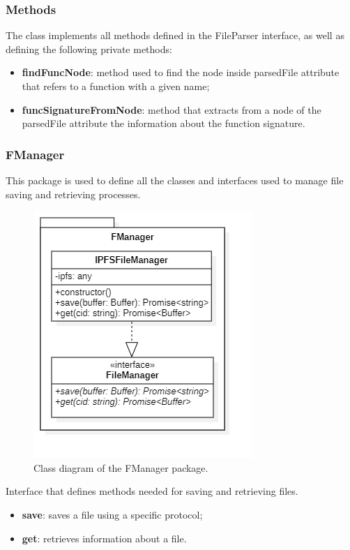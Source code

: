 				\subsubsection*{Methods}
				The class implements all methods defined in the FileParser interface, as well as defining the following private methods: 
				\begin{itemize}
					\item \textbf{findFuncNode}: method used to find the node inside parsedFile attribute that refers to a function with a given name; 
					\item \textbf{funcSignatureFromNode}: method that extracts from a node of the parsedFile attribute the information about the function signature. 
				\end{itemize}
			
		\subsubsection{FManager} 			
		This package is used to define all the classes and interfaces used to manage file saving and retrieving processes.
		\begin{figure} [h!]
			\centering
			\includegraphics[width=0.5\linewidth]{diagrammi/etherless-cli/FManager}
			\caption{Class diagram of the FManager package.}
		\end{figure}	
				
			Interface that defines methods needed for saving and retrieving files. 
		
					\begin{itemize}
						\item \textbf{save}: saves a file using a specific protocol;
						\item \textbf{get}: retrieves information about a file.
				\end{itemize}
			
